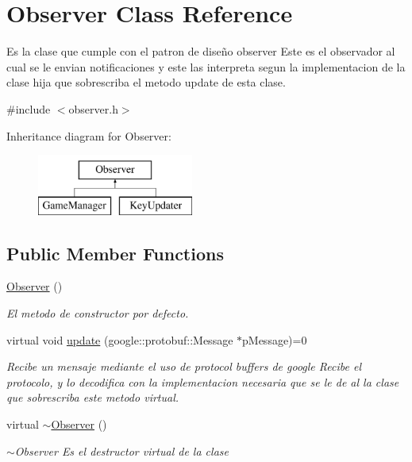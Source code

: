\hypertarget{class_observer}{\section{Observer Class Reference}
\label{class_observer}
}


Es la clase que cumple con el patron de diseño observer Este es el observador al cual se le envian notificaciones y este las interpreta segun la implementacion de la clase hija que sobrescriba el metodo update de esta clase.  




{\ttfamily \#include $<$observer.\-h$>$}

Inheritance diagram for Observer\-:\begin{figure}[H]
\begin{center}
\leavevmode
\includegraphics[height=2.000000cm]{class_observer}
\end{center}
\end{figure}
\subsection*{Public Member Functions}
\begin{DoxyCompactItemize}
\item 
\hypertarget{class_observer_a19c43f80a38a332a6f694783df3c9835}{\hyperlink{class_observer_a19c43f80a38a332a6f694783df3c9835}{Observer} ()}\label{class_observer_a19c43f80a38a332a6f694783df3c9835}

\begin{DoxyCompactList}\small\item\em El metodo de constructor por defecto. \end{DoxyCompactList}\item 
virtual void \hyperlink{class_observer_a7204fd48ae9f9c2f39ea7e165740c451}{update} (google\-::protobuf\-::\-Message $\ast$p\-Message)=0
\begin{DoxyCompactList}\small\item\em Recibe un mensaje mediante el uso de protocol buffers de google Recibe el protocolo, y lo decodifica con la implementacion necesaria que se le de al la clase que sobrescriba este metodo virtual. \end{DoxyCompactList}\item 
\hypertarget{class_observer_afcc6b67be6c386f2f3d2c363aa59cb47}{virtual \hyperlink{class_observer_afcc6b67be6c386f2f3d2c363aa59cb47}{$\sim$\-Observer} ()}\label{class_observer_afcc6b67be6c386f2f3d2c363aa59cb47}

\begin{DoxyCompactList}\small\item\em $\sim$\-Observer Es el destructor virtual de la clase \end{DoxyCompactList}\end{DoxyCompactItemize}


